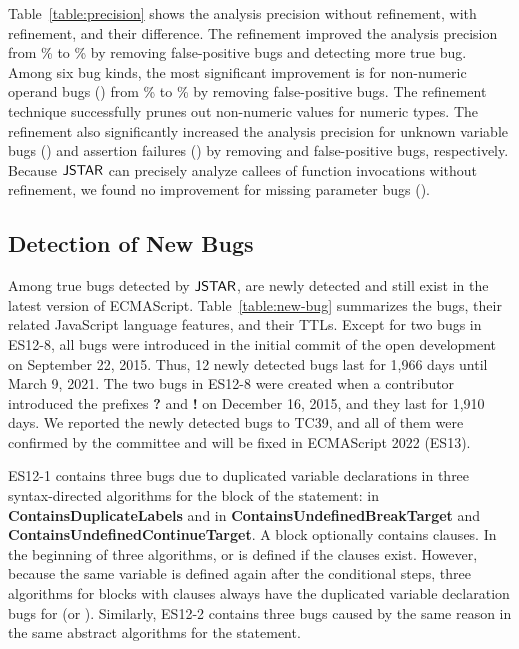 Table~\ref{table:precision} shows the analysis precision without refinement,
with refinement, and their difference.  The refinement improved the analysis
precision from \% to \% by removing 
false-positive bugs and detecting  more true bug.  Among six
bug kinds, the most significant improvement is for non-numeric
operand bugs () from \% to \%
by removing  false-positive bugs.  The refinement technique
successfully prunes out non-numeric values for numeric types.
The refinement also significantly increased the analysis precision for unknown
variable bugs () and assertion failures
() by removing  and  false-positive bugs, respectively.
Because $\tool$ can precisely analyze callees of function invocations
without refinement, we found no improvement for missing
parameter bugs ().


\subsection{Detection of New Bugs}\label{sec:new-bug}

Among  true bugs detected by $\tool$,  are newly
detected and still exist in the latest version of ECMAScript.
Table~\ref{table:new-bug} summarizes the bugs, their
related JavaScript language features, and their TTLs.
Except for two bugs in ES12-8, all bugs were introduced in the initial
commit of the open development on September 22, 2015.
Thus, 12 newly detected bugs last for 1,966 days until March 9, 2021.
The two bugs in ES12-8 were created when a contributor introduced
the prefixes \textbf{?} and \textbf{!} on December 16, 2015, and they last for 1,910 days.
We reported the newly detected bugs to TC39, and all of them were
confirmed by the committee and will be fixed in ECMAScript 2022 (ES13).

ES12-1 contains three bugs due to duplicated variable declarations
in three syntax-directed algorithms for the  block
of the  statement:
 in \textbf{ContainsDuplicateLabels} and
 in \textbf{ContainsUndefinedBreakTarget} and
\textbf{ContainsUndefinedContinueTarget}.
A  block optionally contains  clauses.
In the beginning of three algorithms,
 or  is defined if the clauses exist.
However, because the same variable is defined again after the conditional steps,
three algorithms for  blocks
with  clauses always have the duplicated variable declaration bugs for
 (or ).
Similarly, ES12-2 contains three bugs caused by the same reason in the
same abstract algorithms for the  statement.

